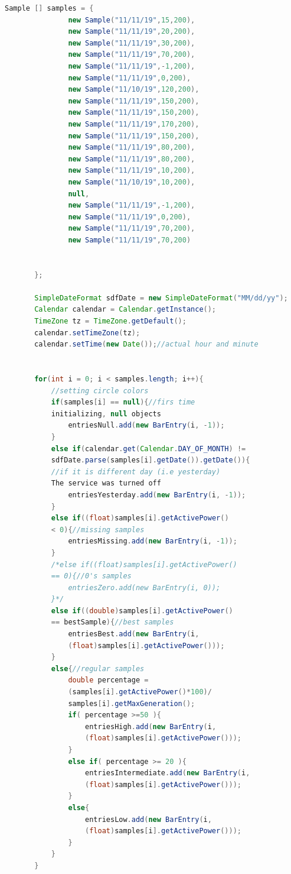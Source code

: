 \begin{lstlisting}[language= Java, frame=single]
       Sample [] samples = {
               new Sample("11/11/19",15,200),
               new Sample("11/11/19",20,200),
               new Sample("11/11/19",30,200),
               new Sample("11/11/19",70,200),
               new Sample("11/11/19",-1,200),
               new Sample("11/11/19",0,200),
               new Sample("11/10/19",120,200),
               new Sample("11/11/19",150,200),
               new Sample("11/11/19",150,200),
               new Sample("11/11/19",170,200),
               new Sample("11/11/19",150,200),
               new Sample("11/11/19",80,200),
               new Sample("11/11/19",80,200),
               new Sample("11/11/19",10,200),
               new Sample("11/10/19",10,200),
               null,
               new Sample("11/11/19",-1,200),
               new Sample("11/11/19",0,200),
               new Sample("11/11/19",70,200),
               new Sample("11/11/19",70,200)


       };

       SimpleDateFormat sdfDate = new SimpleDateFormat("MM/dd/yy");
       Calendar calendar = Calendar.getInstance();
       TimeZone tz = TimeZone.getDefault();
       calendar.setTimeZone(tz);
       calendar.setTime(new Date());//actual hour and minute


       for(int i = 0; i < samples.length; i++){
           //setting circle colors
           if(samples[i] == null){//firs time 
           initializing, null objects
               entriesNull.add(new BarEntry(i, -1));
           }
           else if(calendar.get(Calendar.DAY_OF_MONTH) != 
           sdfDate.parse(samples[i].getDate()).getDate()){
           //if it is different day (i.e yesterday) 
           The service was turned off
               entriesYesterday.add(new BarEntry(i, -1));
           }
           else if((float)samples[i].getActivePower()
           < 0){//missing samples
               entriesMissing.add(new BarEntry(i, -1));
           }
           /*else if((float)samples[i].getActivePower()
           == 0){//0's samples
               entriesZero.add(new BarEntry(i, 0));
           }*/
           else if((double)samples[i].getActivePower()
           == bestSample){//best samples
               entriesBest.add(new BarEntry(i,
               (float)samples[i].getActivePower()));
           }
           else{//regular samples
               double percentage = 
               (samples[i].getActivePower()*100)/
               samples[i].getMaxGeneration();
               if( percentage >=50 ){
                   entriesHigh.add(new BarEntry(i,
                   (float)samples[i].getActivePower()));
               }
               else if( percentage >= 20 ){
                   entriesIntermediate.add(new BarEntry(i, 
                   (float)samples[i].getActivePower()));
               }
               else{
                   entriesLow.add(new BarEntry(i, 
                   (float)samples[i].getActivePower()));
               }
           }
       }



\end{lstlisting}
